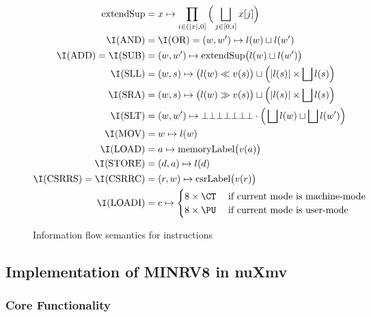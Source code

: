 \begin{figure}
    \begin{align*}
        \text{extendSup} &= x \mapsto \prod_{i \in (|x|, 0]} \Big( \bigsqcup_{j \in [0, i]} x[j] \Big) \\
        \I(\text{AND}) &= \I(\text{OR}) = (w, w') \mapsto l(w) \sqcup l(w') \\
        \I(\text{ADD}) = \I(\text{SUB}) &= (w, w') \mapsto \text{extendSup}\big(l(w) \sqcup l(w') \big) \\
        \I(\text{SLL}) &= (w, s) \mapsto \big(l(w) \ll v(s) \big) \sqcup \Big(|l(s)| \times \bigsqcup l(s) \Big) \\
        \I(\text{SRA}) &= (w, s) \mapsto \big(l(w) \gg v(s) \big) \sqcup \Big(|l(s)| \times \bigsqcup l(s) \Big) \\
        \I(\text{SLT}) &= (w, w') \mapsto \bot\bot\bot\bot\bot\bot\bot \cdot \Big(\bigsqcup l(w) \sqcup \bigsqcup l(w') \Big) \\
        \I(\text{MOV}) &= w \mapsto l(w) \\
        \I(\text{LOAD}) &= a \mapsto \text{memoryLabel}\big(v(a) \big) \\
        \I(\text{STORE}) &= (d, a) \mapsto l(d) \\
        \I(\text{CSRRS}) = \I(\text{CSRRC}) &= (r, w) \mapsto \text{csrLabel}\big(v(r) \big) \\
        \I(\text{LOADI}) &= c \mapsto \begin{cases}
            8 \times \CT & \; \text{if current mode is machine-mode} \\
            8 \times \PU & \; \text{if current mode is user-mode}
        \end{cases}
    \end{align*}
    \caption{Information flow semantics for instructions}
    \label{fig:ifc-semantics}
\end{figure}

\subsection{Implementation of MINRV8 in nuXmv}
\label{sec:model-implementation}


\subsubsection{Core Functionality}

